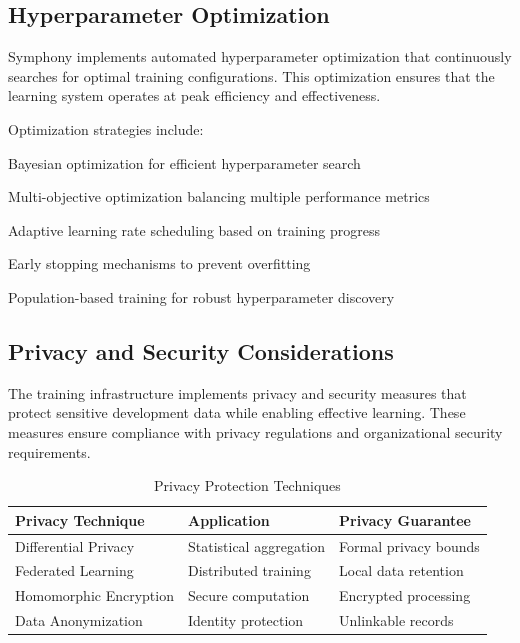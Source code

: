 \subsection*{Hyperparameter Optimization}

Symphony implements automated hyperparameter optimization that continuously searches for optimal training configurations. This optimization ensures that the learning system operates at peak efficiency and effectiveness.

Optimization strategies include:

\begin{compactlist}
    \item Bayesian optimization for efficient hyperparameter search
    \item Multi-objective optimization balancing multiple performance metrics
    \item Adaptive learning rate scheduling based on training progress
    \item Early stopping mechanisms to prevent overfitting
    \item Population-based training for robust hyperparameter discovery
\end{compactlist}

\subsection*{Privacy and Security Considerations}

The training infrastructure implements privacy and security measures that protect sensitive development data while enabling effective learning. These measures ensure compliance with privacy regulations and organizational security requirements.

\begin{table}[ht]
\centering
\begin{tabular}{@{}lll@{}}
\toprule
\textbf{Privacy Technique} & \textbf{Application} & \textbf{Privacy Guarantee} \\
\midrule
Differential Privacy & Statistical aggregation & Formal privacy bounds \\
Federated Learning & Distributed training & Local data retention \\
Homomorphic Encryption & Secure computation & Encrypted processing \\
Data Anonymization & Identity protection & Unlinkable records \\
\bottomrule
\end{tabular}
\caption{Privacy Protection Techniques}
\end{table}

